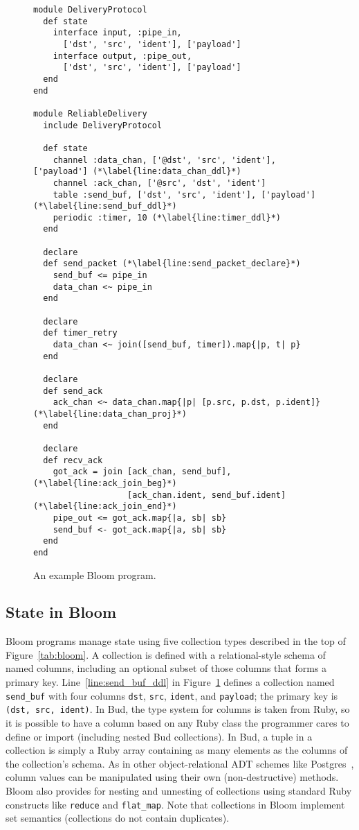 \begin{figure}[t]
\begin{scriptsize}
\begin{lstlisting}
module DeliveryProtocol
  def state
    interface input, :pipe_in,
      ['dst', 'src', 'ident'], ['payload']
    interface output, :pipe_out,
      ['dst', 'src', 'ident'], ['payload']
  end
end

module ReliableDelivery
  include DeliveryProtocol

  def state
    channel :data_chan, ['@dst', 'src', 'ident'], ['payload'] (*\label{line:data_chan_ddl}*)
    channel :ack_chan, ['@src', 'dst', 'ident']
    table :send_buf, ['dst', 'src', 'ident'], ['payload'] (*\label{line:send_buf_ddl}*)
    periodic :timer, 10 (*\label{line:timer_ddl}*)
  end

  declare
  def send_packet (*\label{line:send_packet_declare}*)
    send_buf <= pipe_in
    data_chan <~ pipe_in
  end

  declare
  def timer_retry
    data_chan <~ join([send_buf, timer]).map{|p, t| p}
  end

  declare
  def send_ack
    ack_chan <~ data_chan.map{|p| [p.src, p.dst, p.ident]} (*\label{line:data_chan_proj}*)
  end

  declare
  def recv_ack
    got_ack = join [ack_chan, send_buf], (*\label{line:ack_join_beg}*)
                   [ack_chan.ident, send_buf.ident] (*\label{line:ack_join_end}*)
    pipe_out <= got_ack.map{|a, sb| sb}
    send_buf <- got_ack.map{|a, sb| sb}
  end
end
\end{lstlisting}
\centering
\vspace{-10pt}
\caption{An example Bloom program.}
\label{fig:bloom-example}
\end{scriptsize}
\vspace{-2pt}
\end{figure}

\subsection{State in Bloom}
Bloom programs manage state using five collection types described in the top of
Figure~\ref{tab:bloom}. A collection is defined with a relational-style schema
of named columns, including an optional subset of those columns that forms a
primary key. Line~\ref{line:send_buf_ddl} in Figure~\ref{fig:bloom-example}
defines a collection named \texttt{send\_buf} with four columns \texttt{dst},
\texttt{src}, \texttt{ident}, and \texttt{payload}; the primary key is
\texttt{(dst,~src,~ident)}. In Bud, the type system for columns is taken from
Ruby, so it is possible to have a column based on any Ruby class the programmer
cares to define or import (including nested Bud collections).  In Bud, a tuple
in a collection is simply a Ruby array containing as many elements as the
columns of the collection's schema.  As in other object-relational ADT schemes
like Postgres~\cite{postgres-adt}, column values can be manipulated using their
own (non-destructive) methods. Bloom also provides for nesting and unnesting of
collections using standard Ruby constructs like \texttt{reduce} and
\texttt{flat\_map}. Note that collections in Bloom implement set semantics
(collections do not contain duplicates).

